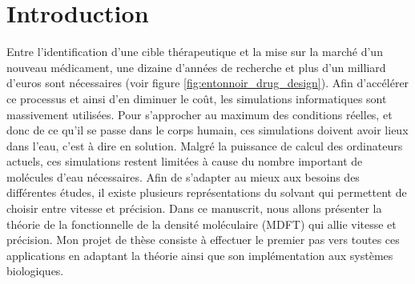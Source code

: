 \chapter{Introduction}
\label{chap:introduction}

Entre l'identification d'une cible thérapeutique et la mise sur la marché d'un nouveau médicament, une dizaine d'années de recherche et plus d'un milliard d’euros sont nécessaires\cite{DiMasi_price_2003, Siddiqui_high_2012} (voir figure \ref{fig:entonnoir_drug_design}). Afin d'accélérer ce processus et ainsi d'en diminuer le coût, les simulations informatiques sont massivement utilisées. Pour s'approcher au maximum des conditions réelles, et donc de ce qu'il se passe dans le corps humain, ces simulations doivent avoir lieux dans l'eau, c'est à dire en solution. Malgré la puissance de calcul des ordinateurs actuels, ces simulations restent limitées à cause du nombre important de molécules d'eau nécessaires. Afin de s'adapter au mieux aux besoins des différentes études, il existe plusieurs représentations du solvant qui permettent de choisir entre vitesse et précision. Dans ce manuscrit, nous allons présenter la théorie de la fonctionnelle de la densité moléculaire\cite{jeanmairet_molecular_2013-1,jeanmairet_classical_2015,Jeanmairet_introduction_2014,jeanmairet_hydration_2014,levesque_solvation_2012} (MDFT) qui allie vitesse et précision. Mon projet de thèse consiste à effectuer le premier pas vers toutes ces applications en adaptant la théorie ainsi que son implémentation aux systèmes biologiques.


